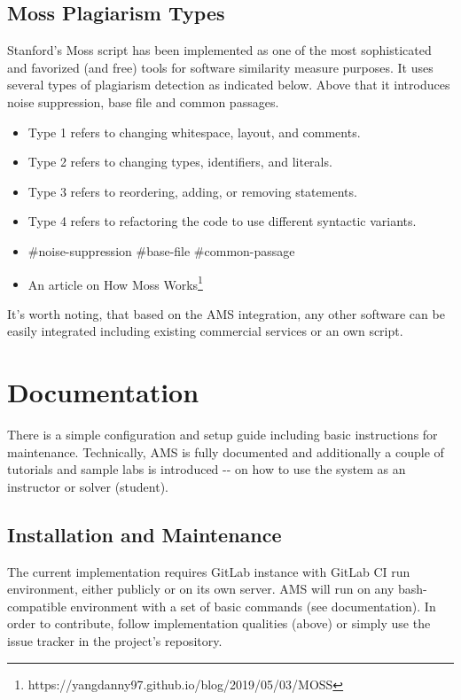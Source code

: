 \subsection{Moss Plagiarism Types}\label{ssec:mossplagtyp}

{Stanford's Moss script has been implemented as one of the most sophisticated and favorized (and free) tools for software similarity measure purposes. It uses several types of plagiarism detection as indicated below. Above that it introduces noise suppression, base file and common passages.}

\begin{itemize}
\item
  {Type 1 refers to changing whitespace, layout, and comments.}
\item
  {Type 2 refers to changing types, identifiers, and literals.}
\item
  {Type 3 refers to reordering, adding, or removing statements.}
\item
  {Type 4 refers to refactoring the code to use different syntactic variants.}
\item
  {\#noise-suppression \#base-file \#common-passage}
\item
  {An article on How Moss Works\footnote{https://yangdanny97.github.io/blog/2019/05/03/MOSS}}
\end{itemize}

{It's worth noting, that based on the AMS integration, any other software can be easily integrated including existing commercial services or an own script.}

\section{Documentation}\label{sec:doc}

{There is a simple configuration and setup guide including basic instructions for maintenance. Technically, AMS is fully documented and additionally a couple of tutorials and sample labs is introduced -\/- on how to use the system as an instructor or solver (student).}

\subsection{Installation and Maintenance}\label{ssec:installandmaint}

{The current implementation requires GitLab instance with GitLab CI run environment, either publicly or on its own server. AMS will run on any bash-compatible environment with a set of basic commands (see documentation). In order to contribute, follow implementation qualities (above) or simply use the issue tracker in the project's repository.}

